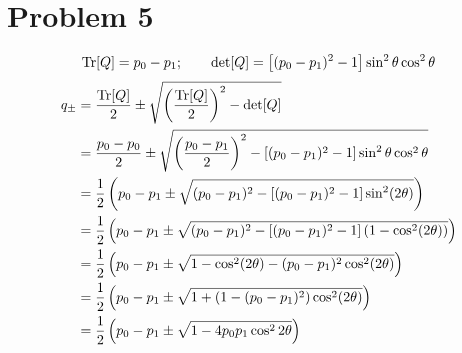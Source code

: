\documentclass[12pt]{article}
\begin{document}
\section*{Problem 5}
\[ \Tr[Q] = p_0 - p_1; \qquad \det[Q] = \left[(p_0-p_1)^2 - 1\right]\sin^2\theta\cos^2\theta \]
\begin{align*}
    q_{\pm} &= \frac{\Tr[Q]}{2} \pm \sqrt{\left(\frac{\Tr[Q]}{2}\right)^2 - \det[Q]} \\
    &= \frac{p_0-p_0}{2} \pm \sqrt{\left(\frac{p_0-p_1}{2}\right)^2 - \left[(p_0-p_1)^2 - 1\right]\sin^2\theta\cos^2\theta} \\
    &= \frac{1}{2}\left(p_0 - p_1 \pm \sqrt{(p_0-p_1)^2 - \left[(p_0-p_1)^2 - 1\right]\sin^2(2\theta)}\right) \\
    &= \frac{1}{2}\left(p_0 - p_1 \pm \sqrt{(p_0-p_1)^2 - \left[(p_0-p_1)^2 - 1\right]\left(1-\cos^2(2\theta)\right)}\right) \\
    &= \frac{1}{2}\left(p_0 - p_1 \pm \sqrt{1 - \cos^2(2\theta) - (p_0 - p_1)^2\cos^2(2\theta)}\right) \\
    &= \frac{1}{2}\left(p_0 - p_1 \pm \sqrt{1 + (1 - (p_0 - p_1)^2)\cos^2(2\theta)} \right) \\
    &= \frac{1}{2}\left(p_0 - p_1 \pm \sqrt{1 - 4p_0p_1\cos^2{2\theta}}\right)
\end{align*}
\end{document}
